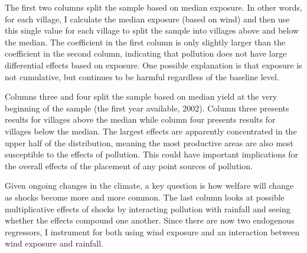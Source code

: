 \documentclass[
]{article}
\begin{document}
The first two columns split the sample based on median exposure. In other words, for each village, I calculate the median exposure (based on wind) and then use this single value for each village to split the sample into villages above and below the median. The coefficient in the first column is only slightly larger than the coefficient in the second column, indicating that pollution does not have large differential effects based on exposure. One possible explanation is that exposure is not cumulative, but continues to be harmful regardless of the baseline level.

Columns three and four split the sample based on median yield at the very beginning of the sample (the first year available, 2002). Column three presents results for villages above the median while column four presents results for villages below the median. The largest effects are apparently concentrated in the upper half of the distribution, meaning the most productive areas are also most susceptible to the effects of pollution. This could have important implications for the overall effects of the placement of any point sources of pollution.

Given ongoing changes in the climate, a key question is how welfare will change as shocks become more and more common. The last column looks at possible multiplicative effects of shocks by interacting pollution with rainfall and seeing whether the effects compound one another. Since there are now two endogenous regressors, I instrument for both using wind exposure and an interaction between wind exposure and rainfall.
\end{document}
